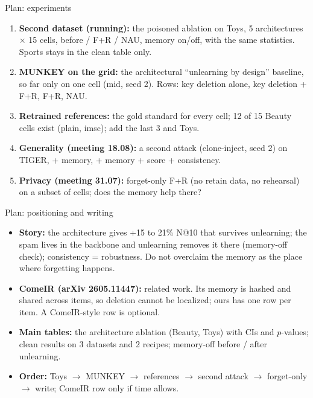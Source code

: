 \documentclass{beamer}
\begin{document}
\begin{frame}{Plan: experiments}
\footnotesize
\begin{enumerate}
  \item \textbf{Second dataset (running):} the poisoned ablation on Toys,
        5 architectures $\times$ 15 cells, before / F+R / NAU, memory on/off,
        with the same statistics. Sports stays in the clean table only.
  \item \textbf{MUNKEY on the grid:} the architectural ``unlearning by
        design'' baseline, so far only on one cell (mid, seed 2). Rows:
        key deletion alone, key deletion + F+R, F+R, NAU.
  \item \textbf{Retrained references:} the gold standard for every cell;
        12 of 15 Beauty cells exist (plain, imsc); add the last 3 and Toys.
  \item \textbf{Generality (meeting 18.08):} a second attack (clone-inject,
        seed 2) on TIGER, + memory, + memory + score + consistency.
  \item \textbf{Privacy (meeting 31.07):} forget-only F+R (no retain data,
        no rehearsal) on a subset of cells; does the memory help there?
\end{enumerate}
\end{frame}

\begin{frame}{Plan: positioning and writing}
\footnotesize
\begin{itemize}
  \item \textbf{Story:} the architecture gives +15 to 21\% N@10 that
        survives unlearning; the spam lives in the backbone and unlearning
        removes it there (memory-off check); consistency = robustness.
        Do not overclaim the memory as the place where forgetting happens.
  \item \textbf{ComeIR (arXiv 2605.11447):} related work. Its memory is
        hashed and shared across items, so deletion cannot be localized;
        ours has one row per item. A ComeIR-style row is optional.
  \item \textbf{Main tables:} the architecture ablation (Beauty, Toys) with
        CIs and $p$-values; clean results on 3 datasets and 2 recipes;
        memory-off before / after unlearning.
  \item \textbf{Order:} Toys $\rightarrow$ MUNKEY $\rightarrow$ references
        $\rightarrow$ second attack $\rightarrow$ forget-only $\rightarrow$
        write; ComeIR row only if time allows.
\end{itemize}
\end{frame}
\end{document}
